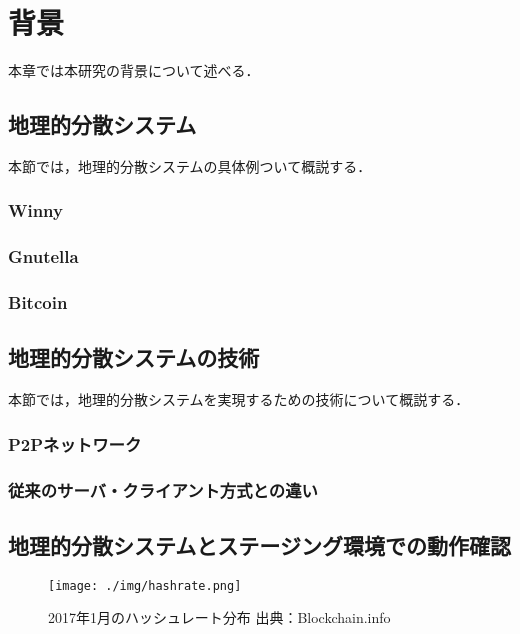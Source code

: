 \chapter{背景}
\label{background}

本章では本研究の背景について述べる．

\section{地理的分散システム}
本節では，地理的分散システムの具体例ついて概説する．

\subsection{Winny}

\subsection{Gnutella}

\subsection{Bitcoin}

\section{地理的分散システムの技術}
本節では，地理的分散システムを実現するための技術について概説する．

\subsection{P2Pネットワーク}

\subsection{従来のサーバ・クライアント方式との違い}

\section{地理的分散システムとステージング環境での動作確認}

\begin{figure}[h]
    \begin{center}
        \texttt{[image: ./img/hashrate.png]}
        \caption{2017年1月のハッシュレート分布 出典：Blockchain.info\cite{bitcoinhashrate}}
        \label{img:hashrate}
    \end{center}
\end{figure}
\fi
